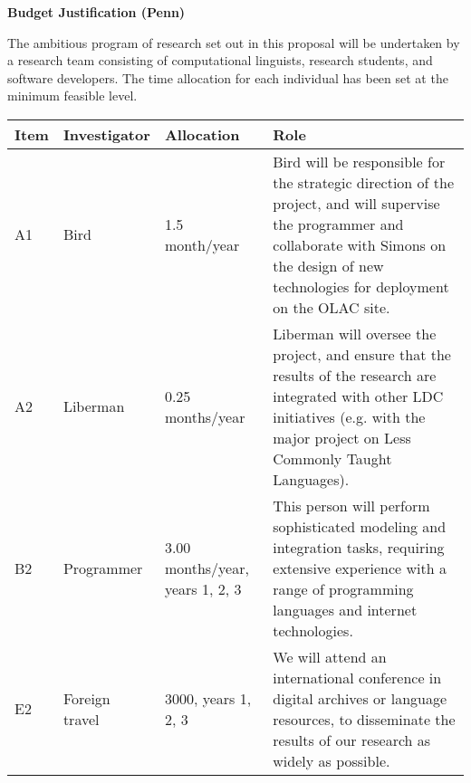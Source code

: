 \documentclass[11pt]{nsf}
\begin{document}
\begin{center}\textbf{\Large
Budget Justification (Penn)
}\end{center}

The ambitious program of research set out in this proposal will be
undertaken by a research team consisting of computational linguists,
research students, and software developers.  The time allocation for
each individual has been set at the minimum feasible level.

\vspace{1ex}

{\small\noindent
\begin{tabular}{lllp{3in}}
\textbf{Item} &
\textbf{Investigator} & \textbf{Allocation} & \textbf{Role} \\ \hline

A1 & Bird & 1.5 month/year &
Bird will be responsible for the strategic direction of the project,
and will supervise the programmer and collaborate with Simons on the
design of new technologies for deployment on the OLAC site.\\

A2 & Liberman & 0.25 months/year &
Liberman will oversee the project, and ensure that the results of the
research are integrated with other LDC initiatives (e.g. with the
major project on Less Commonly Taught Languages).\\

B2 & Programmer & 3.00 months/year, years 1, 2, 3 &
This person will perform sophisticated modeling and integration tasks,
requiring extensive experience with a range of programming languages
and internet technologies. \\

E2 & Foreign travel & 3000, years 1, 2, 3 &
We will attend an international conference in digital archives or
language resources, to disseminate the results of our research as
widely as possible. \\

\end{tabular}}
\end{document}
